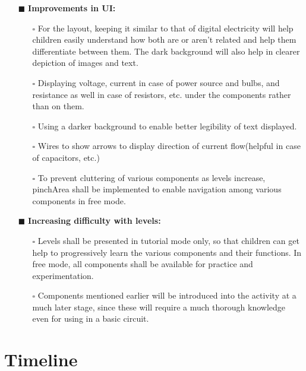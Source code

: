 \documentclass[preprint,12pt]{elsarticle}
\begin{document}
\begin{itemize}
		\item[$\blacksquare$] \textbf{Improvements in UI:}
			\begin{itemize}
			\item[$\square$] {For the layout, keeping it similar to that of digital electricity will help children easily understand how both are or aren’t related and help them differentiate between them. The dark background will also help in clearer depiction of images and text.}
			\item[$\square$] {Displaying voltage, current in case of power source and bulbs, and resistance as well in case of resistors, etc. under the components rather than on them.}
			
			\item[$\square$] {Using a darker background to enable better legibility of text displayed.}
			
			\item[$\square$] {Wires to show arrows to display direction of current flow(helpful in case of capacitors, etc.)}
			
			\item[$\square$] {To prevent cluttering of various components as levels increase, pinchArea shall be implemented to enable navigation among various components in free mode.}\\
			\end{itemize}
			
		\item[$\blacksquare$] \textbf{Increasing difficulty with levels:}
			\begin{itemize}
			\item[$\square$] {Levels shall be presented in tutorial mode only, so that children can get help to progressively learn the various components and their functions. In free mode, all components shall be available for practice and experimentation.}
			
			\item[$\square$] {Components mentioned earlier will be introduced into the activity at a much later stage, since these will require a much thorough knowledge even for using in a basic circuit.}
			\end{itemize}
		\end{itemize}
\bigskip\bigskip

\section{Timeline}
\label{S:1}
\end{document}
